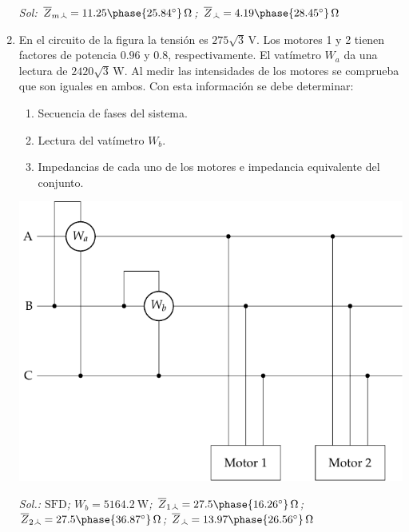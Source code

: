 \begin{enumerate}
\emph{Sol:\;
  $\overline{Z}_{m\wye} = 11.25\phase{\ang{25.84}}\,\unit{\ohm}$;\;
  $\overline{Z}_{\wye} = 4.19\phase{\ang{28.45}}\,\unit{\ohm}$
}

\item En el circuito de la figura la tensión es $275\sqrt{3}\,\unit{\volt}$. Los motores 1 y 2 tienen factores de potencia $0.96$ y $0.8$, respectivamente. El vatímetro $W_a$ da una lectura de $2420\sqrt{3}\,\unit{\watt}$. Al medir las intensidades de los motores se comprueba que son iguales en ambos. Con esta información se debe determinar:

\begin{enumerate}
\item Secuencia de fases del sistema.
\item Lectura del vatímetro $W_b$.
\item Impedancias de cada uno de los motores e impedancia equivalente del conjunto.
\end{enumerate}

\begin{center}
  \includegraphics[height=0.27\textheight]{../figs/BT3_13}
\end{center}

\emph{Sol.:\;
  $\mathrm{SFD}$;\;
  $W_b = \qty{5164.2}{\watt}$;\;
  $\overline{Z}_{1\wye} = 27.5\phase{\ang{16.26}}\,\unit{\ohm}$;\;
  $\overline{Z}_{2\wye} = 27.5\phase{\ang{36.87}}\,\unit{\ohm}$;\;
  $\overline{Z}_{\wye} = 13.97\phase{\ang{26.56}}\,\unit{\ohm}$
  }

\end{enumerate}

